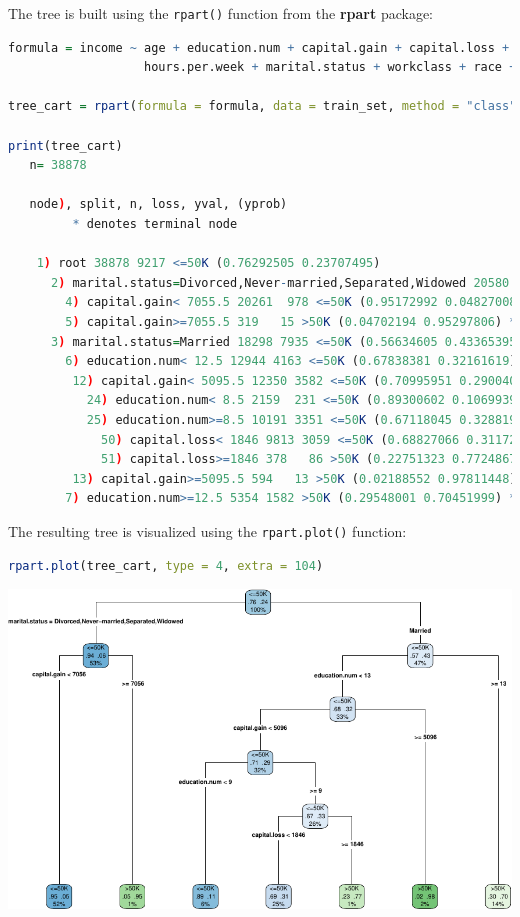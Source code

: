 \documentclass[
]{book}
\newcommand{\passthrough}[1]{#1}
\theoremstyle{definition}
\theoremstyle{definition}
\theoremstyle{definition}
\theoremstyle{definition}
\theoremstyle{remark}
\begin{document}
The tree is built using the \passthrough{\lstinline!rpart()!} function from the \textbf{rpart} package:

\begin{lstlisting}[language=R]
formula = income ~ age + education.num + capital.gain + capital.loss + 
                   hours.per.week + marital.status + workclass + race + gender

tree_cart = rpart(formula = formula, data = train_set, method = "class")

print(tree_cart)
   n= 38878 
   
   node), split, n, loss, yval, (yprob)
         * denotes terminal node
   
    1) root 38878 9217 <=50K (0.76292505 0.23707495)  
      2) marital.status=Divorced,Never-married,Separated,Widowed 20580 1282 <=50K (0.93770651 0.06229349)  
        4) capital.gain< 7055.5 20261  978 <=50K (0.95172992 0.04827008) *
        5) capital.gain>=7055.5 319   15 >50K (0.04702194 0.95297806) *
      3) marital.status=Married 18298 7935 <=50K (0.56634605 0.43365395)  
        6) education.num< 12.5 12944 4163 <=50K (0.67838381 0.32161619)  
         12) capital.gain< 5095.5 12350 3582 <=50K (0.70995951 0.29004049)  
           24) education.num< 8.5 2159  231 <=50K (0.89300602 0.10699398) *
           25) education.num>=8.5 10191 3351 <=50K (0.67118045 0.32881955)  
             50) capital.loss< 1846 9813 3059 <=50K (0.68827066 0.31172934) *
             51) capital.loss>=1846 378   86 >50K (0.22751323 0.77248677) *
         13) capital.gain>=5095.5 594   13 >50K (0.02188552 0.97811448) *
        7) education.num>=12.5 5354 1582 >50K (0.29548001 0.70451999) *
\end{lstlisting}

The resulting tree is visualized using the \passthrough{\lstinline!rpart.plot()!} function:

\begin{lstlisting}[language=R]
rpart.plot(tree_cart, type = 4, extra = 104)
\end{lstlisting}

\begin{center}\includegraphics[width=1\linewidth]{tree_files/figure-latex/unnamed-chunk-7-1} \end{center}
\end{document}
